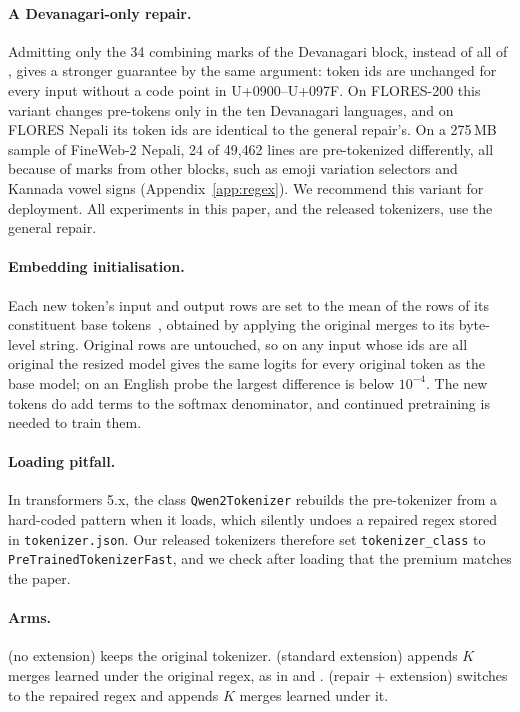\paragraph{A Devanagari-only repair.} Admitting only the 34 combining marks of the Devanagari block, instead of all of \pM{}, gives a stronger guarantee by the same argument: token ids are unchanged for every input without a code point in U+0900--U+097F. On FLORES-200 this variant changes pre-tokens only in the ten Devanagari languages, and on FLORES Nepali its \RII{} token ids are identical to the general repair's. On a 275\,MB sample of FineWeb-2 Nepali, 24 of 49{,}462 lines are pre-tokenized differently, all because of marks from other blocks, such as emoji variation selectors and Kannada vowel signs (Appendix~\ref{app:regex}). We recommend this variant for deployment. All experiments in this paper, and the released tokenizers, use the general repair.

\paragraph{Embedding initialisation.} Each new token's input and output rows are set to the mean of the rows of its constituent base tokens~\citep{gee-etal-2022-fast}, obtained by applying the original merges to its byte-level string. Original rows are untouched, so on any input whose ids are all original the resized model gives the same logits for every original token as the base model; on an English probe the largest difference is below $10^{-4}$. The new tokens do add terms to the softmax denominator, and continued pretraining is needed to train them.

\paragraph{Loading pitfall.} In transformers 5.x, the class \texttt{Qwen2Tokenizer} rebuilds the pre-tokenizer from a hard-coded pattern when it loads, which silently undoes a repaired regex stored in \texttt{tokenizer.json}. Our released tokenizers therefore set \texttt{tokenizer\_class} to \texttt{PreTrainedTokenizerFast}, and we check after loading that the premium matches the paper.

\paragraph{Arms.} \RO{} (no extension) keeps the original tokenizer. \RI{} (standard extension) appends $K$ merges learned under the original regex, as in \citet{purason-etal-2026-teaching} and \citet{yamaguchi2026lowres}. \RII{} (repair + extension) switches to the repaired regex and appends $K$ merges learned under it.
